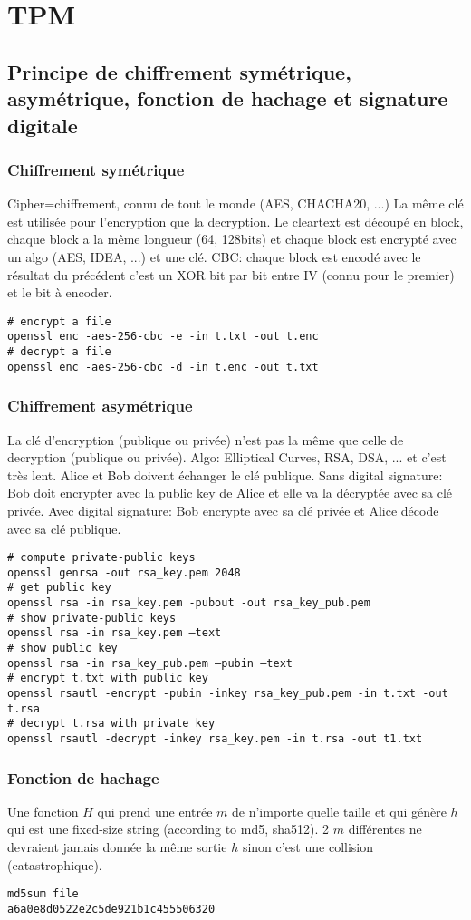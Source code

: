 \section{TPM}
\subsection{Principe de chiffrement symétrique, asymétrique, fonction de hachage et signature digitale}
\subsubsection{Chiffrement symétrique}
Cipher=chiffrement, connu de tout le monde (AES, CHACHA20, ...)
La même clé est utilisée pour l'encryption que la decryption. Le cleartext est découpé en block, chaque block a la même longueur (64, 128bits) et chaque block est encrypté avec un algo (AES, IDEA, ...) et une clé. CBC: chaque block est encodé avec le résultat du précédent c'est un XOR bit par bit entre IV (connu pour le premier) et le bit à encoder.
\begin{Verbatim}[breaklines=true, breakanywhere=true]
# encrypt a file
openssl enc -aes-256-cbc -e -in t.txt -out t.enc
# decrypt a file
openssl enc -aes-256-cbc -d -in t.enc -out t.txt
\end{Verbatim}
\subsubsection{Chiffrement asymétrique}
La clé d'encryption (publique ou privée) n'est pas la même que celle de decryption (publique ou privée). Algo: Elliptical Curves, RSA, DSA, ... et c'est très lent.
Alice et Bob doivent échanger le clé publique. 
Sans digital signature: Bob doit encrypter avec la public key de Alice et elle va la décryptée avec sa clé privée. Avec digital signature: Bob encrypte avec sa clé privée et Alice décode avec sa clé publique.
\begin{Verbatim}[breaklines=true, breakanywhere=true]
# compute private-public keys
openssl genrsa -out rsa_key.pem 2048
# get public key
openssl rsa -in rsa_key.pem -pubout -out rsa_key_pub.pem
# show private-public keys
openssl rsa -in rsa_key.pem –text
# show public key
openssl rsa -in rsa_key_pub.pem –pubin –text
# encrypt t.txt with public key
openssl rsautl -encrypt -pubin -inkey rsa_key_pub.pem -in t.txt -out t.rsa
# decrypt t.rsa with private key
openssl rsautl -decrypt -inkey rsa_key.pem -in t.rsa -out t1.txt
\end{Verbatim}
\subsubsection{Fonction de hachage}
Une fonction $H$ qui prend une entrée $m$ de n'importe quelle taille et qui génère $h$ qui est une fixed-size string (according to md5, sha512). 2 $m$ différentes ne devraient jamais donnée la même sortie $h$ sinon c'est une collision (catastrophique).
\begin{Verbatim}[breaklines=true, breakanywhere=true]
md5sum file
a6a0e8d0522e2c5de921b1c455506320
\end{Verbatim}
